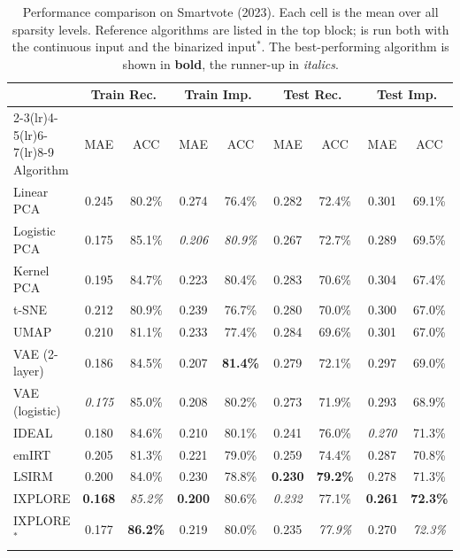 \begin{table}[ht]
\centering
\caption{Performance comparison on Smartvote (2023). Each cell is the mean over all sparsity levels. Reference algorithms are listed in the top block; \IXPLORE is run both with the continuous input and the binarized input$^*$. The best-performing algorithm is shown in \textbf{bold}, the runner-up in \textit{italics}.}
\label{tab:baseline_smartvote_2023}
\small
\begin{tabular}{lcccccccc}
\toprule
 & \multicolumn{2}{c}{Train Rec.} & \multicolumn{2}{c}{Train Imp.} & \multicolumn{2}{c}{Test Rec.} & \multicolumn{2}{c}{Test Imp.} \\
\cmidrule(lr){2-3}\cmidrule(lr){4-5}\cmidrule(lr){6-7}\cmidrule(lr){8-9}
Algorithm & MAE & ACC & MAE & ACC & MAE & ACC & MAE & ACC \\
\midrule
Linear PCA & 0.245 & 80.2\% & 0.274 & 76.4\% & 0.282 & 72.4\% & 0.301 & 69.1\% \\
Logistic PCA & 0.175 & 85.1\% & \textit{0.206} & \textit{80.9\%} & 0.267 & 72.7\% & 0.289 & 69.5\% \\
Kernel PCA & 0.195 & 84.7\% & 0.223 & 80.4\% & 0.283 & 70.6\% & 0.304 & 67.4\% \\
t-SNE & 0.212 & 80.9\% & 0.239 & 76.7\% & 0.280 & 70.0\% & 0.300 & 67.0\% \\
UMAP & 0.210 & 81.1\% & 0.233 & 77.4\% & 0.284 & 69.6\% & 0.301 & 67.0\% \\
VAE (2-layer) & 0.186 & 84.5\% & 0.207 & \textbf{81.4\%} & 0.279 & 72.1\% & 0.297 & 69.0\% \\
VAE (logistic) & \textit{0.175} & 85.0\% & 0.208 & 80.2\% & 0.273 & 71.9\% & 0.293 & 68.9\% \\
IDEAL & 0.180 & 84.6\% & 0.210 & 80.1\% & 0.241 & 76.0\% & \textit{0.270} & 71.3\% \\
emIRT & 0.205 & 81.3\% & 0.221 & 79.0\% & 0.259 & 74.4\% & 0.287 & 70.8\% \\
LSIRM & 0.200 & 84.0\% & 0.230 & 78.8\% & \textbf{0.230} & \textbf{79.2\%} & 0.278 & 71.3\% \\
\midrule
IXPLORE & \textbf{0.168} & \textit{85.2\%} & \textbf{0.200} & 80.6\% & \textit{0.232} & 77.1\% & \textbf{0.261} & \textbf{72.3\%} \\
IXPLORE$^*$ & 0.177 & \textbf{86.2\%} & 0.219 & 80.0\% & 0.235 & \textit{77.9\%} & 0.270 & \textit{72.3\%} \\
\bottomrule
\end{tabular}
\end{table}
